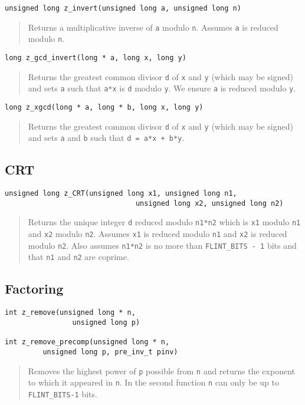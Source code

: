 \documentclass[a4paper,10pt]{article}
\newcommand{\code}{\lstinline}
\begin{document}
\begin{lstlisting}
unsigned long z_invert(unsigned long a, unsigned long n)
\end{lstlisting}
\begin{quote}
Returns a multiplicative inverse of \code{a} modulo \code{n}. Assumes \code{a} is reduced modulo \code{n}.
\end{quote}

\begin{lstlisting}
long z_gcd_invert(long * a, long x, long y)
\end{lstlisting}
\begin{quote}
Returns the greatest common divisor \code{d} of \code{x} and \code{y} (which may be signed) and sets \code{a} such that \code{a*x} is \code{d} modulo \code{y}. We ensure \code{a} is reduced modulo \code{y}.
\end{quote}

\begin{lstlisting}
long z_xgcd(long * a, long * b, long x, long y)
\end{lstlisting}
\begin{quote}
Returns the greatest common divisor \code{d} of \code{x} and \code{y} (which may be signed) and sets \code{a} and \code{b} such that \code{d = a*x + b*y}. 
\end{quote}

\subsection{CRT}

\begin{lstlisting}
unsigned long z_CRT(unsigned long x1, unsigned long n1, 
                               unsigned long x2, unsigned long n2)
\end{lstlisting}
\begin{quote}
Returns the unique integer \code{d} reduced modulo \code{n1*n2} which is \code{x1} modulo \code{n1} and \code{x2} modulo \code{n2}. Assumes \code{x1} is reduced modulo \code{n1} and \code{x2} is reduced modulo \code{n2}. Also assumes \code{n1*n2} is no more than \code{FLINT_BITS - 1} bits and that \code{n1} and \code{n2} are coprime.
\end{quote}

\subsection{Factoring}

\begin{lstlisting}
int z_remove(unsigned long * n, 
                unsigned long p)

int z_remove_precomp(unsigned long * n, 
         unsigned long p, pre_inv_t pinv)
\end{lstlisting}
\begin{quote}
Removes the highest power of \code{p} possible from \code{n} and returns the exponent to which it appeared in \code{n}.  In the second function \code{n} can only be up to \code{FLINT_BITS-1} bits.
\end{quote}
\end{document}
